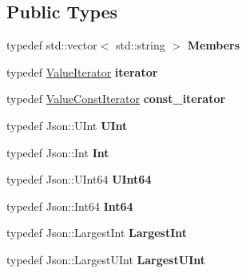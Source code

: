 \subsection*{Public Types}
\begin{DoxyCompactItemize}
\item 
\hypertarget{class_json_1_1_value_ac61bab5a465848b57610379cc07995c3}{}typedef std\+::vector$<$ std\+::string $>$ {\bfseries Members}\label{class_json_1_1_value_ac61bab5a465848b57610379cc07995c3}

\item 
\hypertarget{class_json_1_1_value_a341cdf2e01f8b3c5b7317aa2f0768c53}{}typedef \hyperlink{class_json_1_1_value_iterator}{Value\+Iterator} {\bfseries iterator}\label{class_json_1_1_value_a341cdf2e01f8b3c5b7317aa2f0768c53}

\item 
\hypertarget{class_json_1_1_value_af92282ca92b58b320debd486afb7696a}{}typedef \hyperlink{class_json_1_1_value_const_iterator}{Value\+Const\+Iterator} {\bfseries const\+\_\+iterator}\label{class_json_1_1_value_af92282ca92b58b320debd486afb7696a}

\item 
\hypertarget{class_json_1_1_value_a0933d59b45793ae4aade1757c322a98d}{}typedef Json\+::\+U\+Int {\bfseries U\+Int}\label{class_json_1_1_value_a0933d59b45793ae4aade1757c322a98d}

\item 
\hypertarget{class_json_1_1_value_abdf7a7ff73eb130ffcab28504ffdb405}{}typedef Json\+::\+Int {\bfseries Int}\label{class_json_1_1_value_abdf7a7ff73eb130ffcab28504ffdb405}

\item 
\hypertarget{class_json_1_1_value_a8b62564be8c087c6d18de180ff4e13e3}{}typedef Json\+::\+U\+Int64 {\bfseries U\+Int64}\label{class_json_1_1_value_a8b62564be8c087c6d18de180ff4e13e3}

\item 
\hypertarget{class_json_1_1_value_a1b86af9f85f0f1baa972c3319fa22695}{}typedef Json\+::\+Int64 {\bfseries Int64}\label{class_json_1_1_value_a1b86af9f85f0f1baa972c3319fa22695}

\item 
\hypertarget{class_json_1_1_value_a1cbb82642ed05109b9833e49f042ece7}{}typedef Json\+::\+Largest\+Int {\bfseries Largest\+Int}\label{class_json_1_1_value_a1cbb82642ed05109b9833e49f042ece7}

\item 
\hypertarget{class_json_1_1_value_a6682a3684d635e03fc06ba229fa24eec}{}typedef Json\+::\+Largest\+U\+Int {\bfseries Largest\+U\+Int}\label{class_json_1_1_value_a6682a3684d635e03fc06ba229fa24eec}


\end{DoxyCompactItemize}
